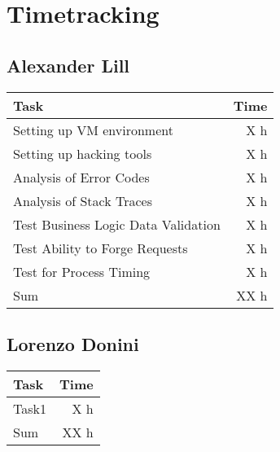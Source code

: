 \chapter{Timetracking}\label{chapter:timetracking}
\section*{Alexander Lill}
\begin{table}[h!tpb]
  \centering
  \begin{tabularx}{\textwidth}{X r}
    \toprule
      Task & Time \\
    \midrule
      Setting up VM environment & X h \\
      Setting up hacking tools & X h \\
      Analysis of Error Codes & X h \\
      Analysis of Stack Traces & X h \\
      Test Business Logic Data Validation & X h \\
      Test Ability to Forge Requests & X h \\
      Test for Process Timing & X h \\
    \midrule
      Sum & XX h \\
    \bottomrule
  \end{tabularx}
\end{table}

\clearpage
\section*{Lorenzo Donini}
\begin{table}[h!tpb]
  \centering
  \begin{tabularx}{\textwidth}{X r}
    \toprule
      Task & Time \\
    \midrule
      Task1 & X h \\
    \midrule
      Sum & XX h \\
    \bottomrule
  \end{tabularx}
\end{table}

\clearpage
